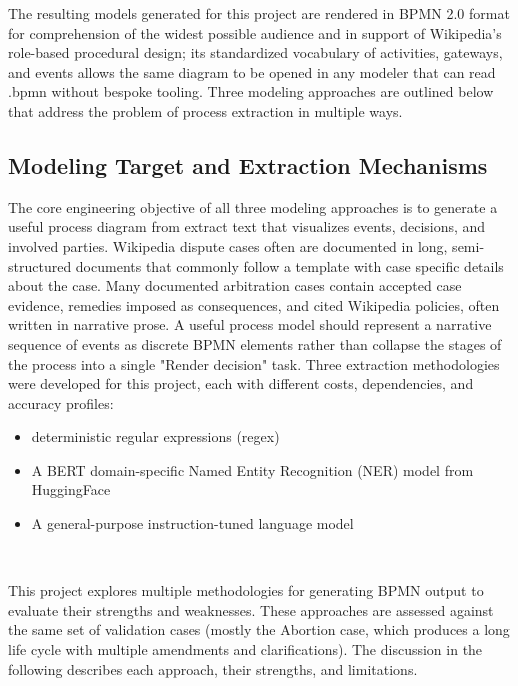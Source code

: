 \documentclass[conference]{IEEEtran}
\begin{document}
The resulting models generated for this project are rendered in BPMN 2.0 format for comprehension of the widest possible audience and in support of Wikipedia's role-based procedural design; its standardized vocabulary of activities, gateways, and events allows the same diagram to be opened in any modeler that can read .bpmn without bespoke tooling. Three modeling approaches are outlined below that address the problem of process extraction in multiple ways.


\subsection{Modeling Target and Extraction Mechanisms}
The core engineering objective of all three modeling approaches is to generate a useful process diagram from extract text that visualizes events, decisions, and involved parties. Wikipedia dispute cases often are documented in long, semi-structured documents that commonly follow a template with case specific details about the case. Many documented arbitration cases contain accepted case evidence, remedies imposed as consequences, and cited Wikipedia policies, often written in narrative prose. A useful process model should represent a narrative sequence of events as discrete BPMN elements rather than collapse the stages of the process into a single "Render decision" task.
Three extraction methodologies were developed for this project, each with different costs, dependencies, and accuracy profiles:
\begin{itemize}
\item deterministic regular expressions (regex)
\item A BERT domain-specific Named Entity Recognition (NER) model from HuggingFace
\item A general-purpose instruction-tuned language model
\end{itemize}\

This project explores multiple methodologies for generating BPMN output to evaluate their strengths and weaknesses. These approaches are assessed against the same set of validation cases (mostly the Abortion case, which produces a long life cycle with multiple amendments and clarifications). The discussion in the following describes each approach, their strengths, and limitations.
\end{document}
